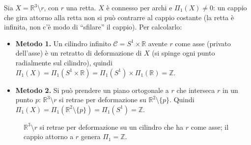 \begin{ejemplo}
Sia $X = \mathbb{R}^3 \setminus r$, con $r$ una retta. $X$ \`e connesso per archi e $\Pi_1(X) \neq 0$: un cappio che gira attorno alla retta non si pu\`o contrarre al cappio costante (la retta \`e infinita, non c'\`e modo di ``sfilare'' il cappio). Per calcolarlo:
\begin{itemize}
    \item \textbf{Metodo 1.} Un cilindro infinito $\mathscr{C} = S^1 \times \mathbb{R}$ avente $r$ come asse (privato dell'asse) \`e un retratto di deformazione di $X$ (si spinge ogni punto radialmente sul cilindro), quindi $\Pi_1(X) = \Pi_1(S^1 \times \mathbb{R}) = \Pi_1(S^1) \times \Pi_1(\mathbb{R}) = \mathbb{Z}$.
    \item \textbf{Metodo 2.} Si pu\`o prendere un piano ortogonale a $r$ che interseca $r$ in un punto $p$: $\mathbb{R}^3 \setminus r$ si retrae per deformazione su $\mathbb{R}^2 \setminus \{p\}$. Quindi $\Pi_1(X) = \Pi_1(\mathbb{R}^2 \setminus \{p\}) = \Pi_1(S^1) = \mathbb{Z}$.
\end{itemize}
\end{ejemplo}

\begin{figure}[H]
    \centering
    \caption{$\mathbb{R}^3 \setminus r$ si retrae per deformazione su un cilindro che ha $r$ come asse; il cappio attorno a $r$ genera $\Pi_1 = \mathbb{Z}$.}
\end{figure}

